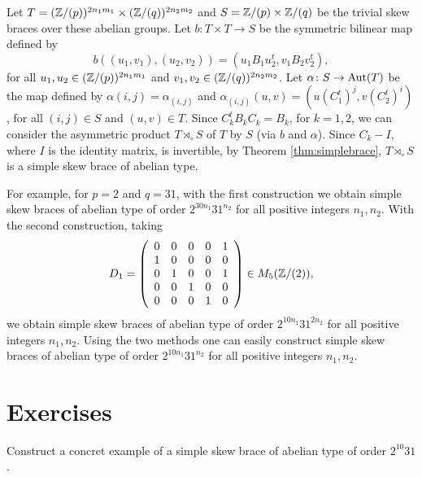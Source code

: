 Let $T=(\mathbb{Z}/(p))^{2n_1m_1}\times (\mathbb{Z}/(q))^{2n_2m_2}$ and $S=\mathbb{Z}/(p)\times\mathbb{Z}/(q)$ be the trivial skew braces over these abelian groups.
Let $b\colon T\times T\rightarrow S$ be the symmetric bilinear map defined by
$$b((u_1,v_1),(u_2,v_2))=(u_1B_1u_2^t,v_1B_2v_2^t),$$
for all $u_1,u_2\in (\mathbb{Z}/(p))^{2n_1m_1}$ and $v_1,v_2\in (\mathbb{Z}/(q))^{2n_2m_2}$.
Let $\alpha\colon S\rightarrow \operatorname{Aut}(T)$ be the map defined by $\alpha(i,j)=\alpha_{(i,j)}$ and $\alpha_{(i,j)}(u,v)=(u(C_1^{t})^j,v(C_2^t)^{i})$, for all $(i,j)\in S$ and $(u,v)\in T$. Since $C_k^tB_kC_k=B_k$, for $k=1,2$, we can consider the asymmetric product $T\rtimes_{\circ}S$ of $T$ by $S$ (via $b$ and $\alpha$). Since $C_k-I$, where $I$ is the identity matrix, is invertible, by Theorem \ref{thm:simplebrace}, $T\rtimes_{\circ}S$ is a simple skew brace of abelian type. 

For example, for $p=2$ and $q=31$, with the first construction we obtain simple skew braces of abelian type of order $2^{30n_1}31^{n_2}$ for all positive integers $n_1,n_2$. With the second construction, taking
$$D_1=\left(\begin{array}{ccccc}
0&0&0&0&1\\
1&0&0&0&0\\
0&1&0&0&1\\
0&0&1&0&0\\
0&0&0&1&0\end{array}\right)\in M_5(\mathbb{Z}/(2)),$$
we obtain simple skew braces of abelian type of order $2^{10n_1}31^{2n_2}$ for all positive integers $n_1,n_2$. Using the two methods one can easily construct simple skew braces of abelian type of order $2^{10n_1}31^{n_2}$ for all positive integers $n_1,n_2$.



\section{Exercises}

\begin{prob} Construct a concret example of a simple skew brace of abelian type of order $2^{10}31$.
\end{prob}

\begin{prob}
\end{prob}


\begin{prob}
\end{prob}

\begin{prob}
\end{prob}

